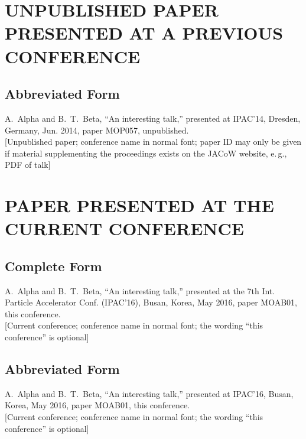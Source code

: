 \documentclass[letterpaper,  %
              ]{jacow-2_3}   %
\begin{document}
\section{UNPUBLISHED PAPER PRESENTED AT A PREVIOUS CONFERENCE}

\subsection{Abbreviated Form}

\begin{thebibliography}{9} %
\setcounter{enumi}{3}
	A.~Alpha and B.~T.~Beta, 
	“An interesting talk,”
	presented at IPAC’14, 
	Dresden, Germany, Jun. 2014, paper MOP057, unpublished.\\
	\textcolor{jred}{[Unpublished paper; conference name in normal font; paper
	ID may only be given if material supplementing the proceedings
	exists on the JACoW website, e.\,g., PDF of talk]}
\end{thebibliography}


\section{PAPER PRESENTED AT THE CURRENT CONFERENCE}

\subsection{Complete Form}

\begin{thebibliography}{9} %
\setcounter{enumi}{4}
	A.~Alpha and B.~T.~Beta, 
	“An interesting talk,”
	presented at the 7th Int. Particle Accelerator Conf. (IPAC’16), 
	Busan, Korea, May 2016, 
	paper MOAB01, this conference.\\
	\textcolor{jgrepc}{[Current conference; conference name in normal font; the
			           wording “this conference” is optional]}
\end{thebibliography}

\subsection{Abbreviated Form}

\begin{thebibliography}{9} %
\setcounter{enumi}{4}
	A.~Alpha and B.~T.~Beta, 
	“An interesting talk,”
	presented at IPAC’16, 
	Busan, Korea, May 2016, 
	paper MOAB01, this conference.\\
	\textcolor{jgrepc}{[Current conference; conference name in normal font; the
		wording “this conference” is optional]}
\end{thebibliography}
\end{document}
